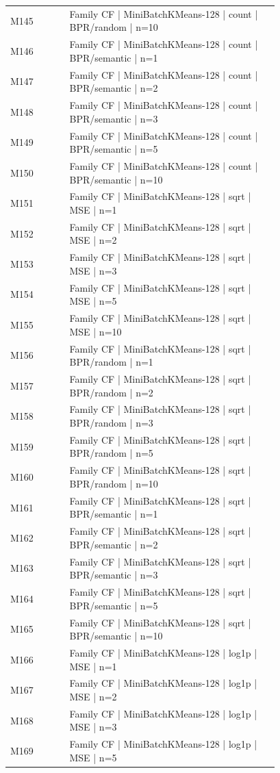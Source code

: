 \begin{longtable}{lp{0.78\linewidth}}
M145 & Family CF | MiniBatchKMeans-128 | count | BPR/random | n=10 \\
M146 & Family CF | MiniBatchKMeans-128 | count | BPR/semantic | n=1 \\
M147 & Family CF | MiniBatchKMeans-128 | count | BPR/semantic | n=2 \\
M148 & Family CF | MiniBatchKMeans-128 | count | BPR/semantic | n=3 \\
M149 & Family CF | MiniBatchKMeans-128 | count | BPR/semantic | n=5 \\
M150 & Family CF | MiniBatchKMeans-128 | count | BPR/semantic | n=10 \\
M151 & Family CF | MiniBatchKMeans-128 | sqrt | MSE | n=1 \\
M152 & Family CF | MiniBatchKMeans-128 | sqrt | MSE | n=2 \\
M153 & Family CF | MiniBatchKMeans-128 | sqrt | MSE | n=3 \\
M154 & Family CF | MiniBatchKMeans-128 | sqrt | MSE | n=5 \\
M155 & Family CF | MiniBatchKMeans-128 | sqrt | MSE | n=10 \\
M156 & Family CF | MiniBatchKMeans-128 | sqrt | BPR/random | n=1 \\
M157 & Family CF | MiniBatchKMeans-128 | sqrt | BPR/random | n=2 \\
M158 & Family CF | MiniBatchKMeans-128 | sqrt | BPR/random | n=3 \\
M159 & Family CF | MiniBatchKMeans-128 | sqrt | BPR/random | n=5 \\
M160 & Family CF | MiniBatchKMeans-128 | sqrt | BPR/random | n=10 \\
M161 & Family CF | MiniBatchKMeans-128 | sqrt | BPR/semantic | n=1 \\
M162 & Family CF | MiniBatchKMeans-128 | sqrt | BPR/semantic | n=2 \\
M163 & Family CF | MiniBatchKMeans-128 | sqrt | BPR/semantic | n=3 \\
M164 & Family CF | MiniBatchKMeans-128 | sqrt | BPR/semantic | n=5 \\
M165 & Family CF | MiniBatchKMeans-128 | sqrt | BPR/semantic | n=10 \\
M166 & Family CF | MiniBatchKMeans-128 | log1p | MSE | n=1 \\
M167 & Family CF | MiniBatchKMeans-128 | log1p | MSE | n=2 \\
M168 & Family CF | MiniBatchKMeans-128 | log1p | MSE | n=3 \\
M169 & Family CF | MiniBatchKMeans-128 | log1p | MSE | n=5 \\

\end{longtable}
